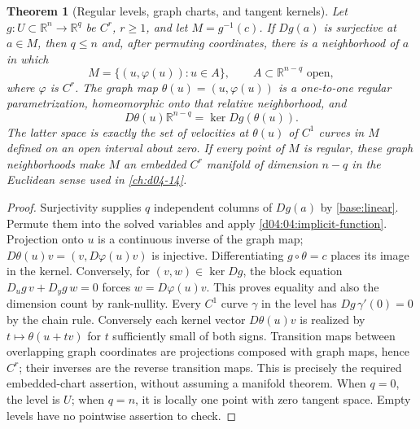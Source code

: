 \documentclass[11pt,oneside,openany]{book}
\newtheorem{theorem}{Theorem}[chapter]
\theoremstyle{definition}
\theoremstyle{remark}
\newcommand{\R}{\mathbb R}
\begin{document}
\begin{theorem}[Regular levels, graph charts, and tangent kernels]\label{d04:04:regular-level}
Let $g:U\subset\R^n\to\R^q$ be $C^r$, $r\geq1$, and let
$M=g^{-1}(c)$. If $Dg(a)$ is surjective at $a\in M$, then $q\leq n$
and, after permuting coordinates, there is a neighborhood of $a$ in which
\[
 M=\{(u,\varphi(u)):u\in A\},\qquad A\subset\R^{n-q}\text{ open},
\]
where $\varphi$ is $C^r$. The graph map
$\theta(u)=(u,\varphi(u))$ is a one-to-one regular parametrization,
homeomorphic onto that relative neighborhood, and
\[
 D\theta(u)\R^{n-q}=\ker Dg(\theta(u)).
\]
The latter space is exactly the set of velocities at $\theta(u)$ of $C^1$
curves in $M$ defined on an open interval about zero. If every point of $M$
is regular, these graph neighborhoods make $M$ an embedded $C^r$ manifold
of dimension $n-q$ in the Euclidean sense used in \cref{ch:d04-14}.
\end{theorem}
\begin{proof}
Surjectivity supplies $q$ independent columns of $Dg(a)$ by
\cref{base:linear}. Permute them into the solved variables and apply
\cref{d04:04:implicit-function}. Projection onto $u$ is a continuous inverse
of the graph map; $D\theta(u)v=(v,D\varphi(u)v)$ is injective.
Differentiating $g\circ\theta=c$ places its image in the kernel.
Conversely, for $(v,w)\in\ker Dg$, the block equation
$D_ug\,v+D_yg\,w=0$ forces $w=D\varphi(u)v$. This proves equality
and also the dimension count by rank-nullity. Every $C^1$ curve $\gamma$
in the level has $Dg\,\gamma'(0)=0$ by the chain rule. Conversely each
kernel vector $D\theta(u)v$ is realized by
$t\mapsto\theta(u+tv)$ for $t$ sufficiently small of both signs.
Transition maps between overlapping graph coordinates are projections
composed with graph maps, hence $C^r$; their inverses are the reverse
transition maps. This is precisely the required embedded-chart assertion,
without assuming a manifold theorem. When $q=0$, the level is $U$;
when $q=n$, it is locally one point with zero tangent space. Empty levels
have no pointwise assertion to check.
\end{proof}
\end{document}
